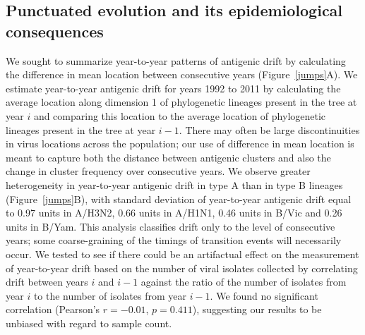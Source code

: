 \documentclass[11pt,oneside,letterpaper]{article}
\begin{document}
\subsection*{Punctuated evolution and its epidemiological consequences}

We sought to summarize year-to-year patterns of antigenic drift by calculating the difference in mean location between consecutive years (Figure~\ref{jumps}A).
We estimate year-to-year antigenic drift for years 1992 to 2011 by calculating the average location along dimension 1 of phylogenetic lineages present in the tree at year $i$ and comparing this location to the average location of phylogenetic lineages present in the tree at year $i-1$.
There may often be large discontinuities in virus locations across the population; our use of difference in mean location is meant to capture both the distance between antigenic clusters and also the change in cluster frequency over consecutive years.
We observe greater heterogeneity in year-to-year antigenic drift in type A than in type B lineages (Figure~\ref{jumps}B), with standard deviation of year-to-year antigenic drift equal to 0.97 units in A/H3N2, 0.66 units in A/H1N1, 0.46 units in B/Vic and 0.26 units in B/Yam.
This analysis classifies drift only to the level of consecutive years; some coarse-graining of the timings of transition events will necessarily occur.
We tested to see if there could be an artifactual effect on the measurement of year-to-year drift based on the number of viral isolates collected by correlating drift between years $i$ and $i-1$ against the ratio of the number of isolates from year $i$ to the number of isolates from year $i-1$.
We found no significant correlation (Pearson's $r = -0.01$, $p = 0.411$), suggesting our results to be unbiased with regard to sample count.
\end{document}
